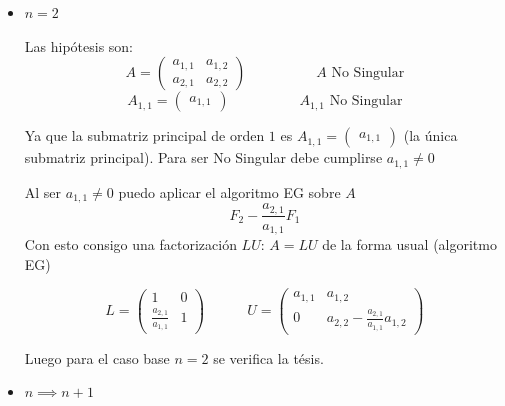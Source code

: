 \begin{itemize}
	\item $n = 2$
	
	Las hipótesis son:
	\[ A = \begin{pmatrix} a_{1,1} & a_{1,2} \\ a_{2,1} & a_{2,2} \end{pmatrix} \hspace{5em}A \text{ No Singular}\]
	\[ A_{1,1} = \begin{pmatrix} a_{1,1} \end{pmatrix} \hspace{5em}A_{1,1} \text{ No Singular} \]
	
	Ya que la submatriz principal de orden $1$ es $ A_{1,1} = \begin{pmatrix} a_{1,1} \end{pmatrix} $ (la única submatriz principal). Para ser No Singular debe cumplirse $a_{1,1} \neq 0$
	
	Al ser $a_{1,1} \neq 0$ puedo aplicar el algoritmo EG sobre $A$
	\[F_2 - \frac{a_{2,1}}{a_{1,1}} F_1 \]
	Con esto consigo una factorización $LU$: $A = LU$ de la forma usual (algoritmo EG)
	
	\[ L = \begin{pmatrix} 1 & 0 \\ \frac{a_{2,1}}{a_{1,1}} & 1 \end{pmatrix} \hspace{3em}
	U = \begin{pmatrix} a_{1,1} & a_{1,2} \\ 0 & a_{2,2} - \frac{a_{2,1}}{a_{1,1}} a_{1,2} \end{pmatrix}
	\] 
	
	Luego para el caso base $n = 2$ se verifica la tésis.
	
	\item $n \implies n+1$
	

\end{itemize}
